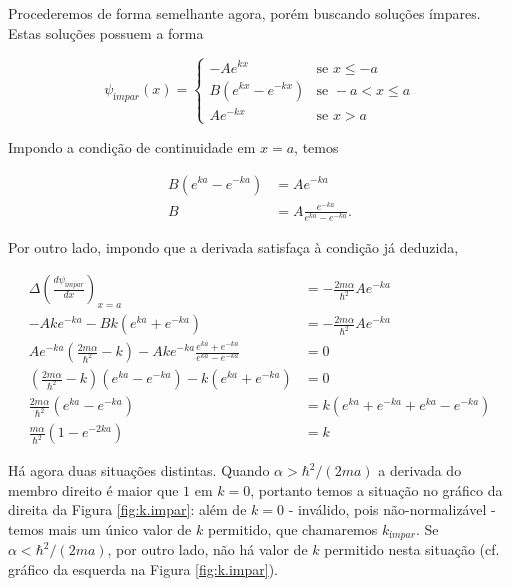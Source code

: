 \documentclass[a4paper, 12pt, notitlepage]{article}
\begin{document}
\begin{enumerate}
\begin{enumerate}
    Procederemos de forma semelhante agora, porém buscando soluções ímpares. Estas soluções possuem a forma
    
    \begin{equation*}
    \psi_{ímpar}(x) = 
    \begin{cases}
      -Ae^{kx} &\text{se }x \leq -a\\
      B\left(e^{kx} - e^{-kx}\right) &\text{se }-a < x \leq a\\
      Ae^{-kx} &\text{se }x > a
    \end{cases}
    \end{equation*}
    
    Impondo a condição de continuidade em $x = a$, temos
    
    \begin{align*}
    B\left(e^{ka} - e^{-ka}\right) &= Ae^{-ka} \\
    B &= A \frac{e^{-ka}}{e^{ka} - e^{-ka}}.
    \end{align*}
    
    Por outro lado, impondo que a derivada satisfaça à condição já deduzida,
    
    \begin{align*}
    \Delta\left(\frac{d \psi_{ímpar}}{dx}\right)_{x = a} &= -\frac{2m\alpha}{\hbar^2} A e^{-ka} \\
    -Ake^{-ka} - Bk\left(e^{ka} + e^{-ka}\right) &= -\frac{2m\alpha}{\hbar^2} A e^{-ka} \\
    Ae^{-ka}\left(\frac{2m\alpha}{\hbar^2} - k\right) - Ak e^{-ka}\frac{e^{ka} + e^{-ka}}{e^{ka} - e^{-ka}} &= 0 \\
    \left(\frac{2m\alpha}{\hbar^2} - k\right)\left(e^{ka} - e^{-ka}\right) - k \left(e^{ka} + e^{-ka}\right) &= 0 \\
    \frac{2m\alpha}{\hbar^2} \left(e^{ka} - e^{-ka}\right) &= k \left(e^{ka} + e^{-ka} + e^{ka} - e^{-ka}\right) \\
    \frac{m\alpha}{\hbar^2}\left(1 - e^{-2ka}\right) &= k
    \end{align*}
    
    Há agora duas situações distintas. Quando $\alpha > \hbar^2/(2ma)$ a derivada do membro direito é maior que $1$ em $k = 0$, portanto temos a situação no gráfico da direita da Figura \ref{fig:k.impar}: além de $k = 0$ - inválido, pois não-normalizável - temos mais um único valor de $k$ permitido, que chamaremos $k_{ímpar}$. Se $\alpha < \hbar^2/(2ma)$, por outro lado, não há valor de $k$ permitido nesta situação (cf. gráfico da esquerda na Figura \ref{fig:k.impar}).
    

\end{enumerate}
\end{enumerate}
\end{document}
